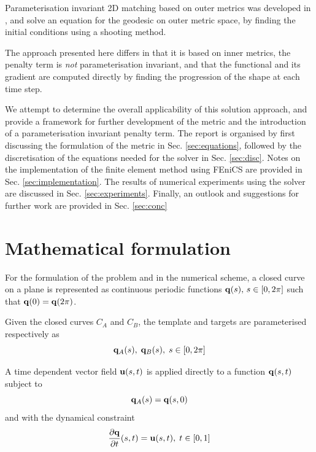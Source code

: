 \documentclass[a4paper, 12pt]{article}
\begin{document}
Parameterisation invariant 2D matching based on outer metrics was developed in
\cite{cotter2009geodesic, cotter2009curves, clark2011reparam}, and solve an
equation for the geodesic on outer metric space, by finding the initial
conditions using a shooting method.

The approach presented here differs in that it is based on inner metrics, the
penalty term is \emph{not} parameterisation invariant, and that the
functional and its gradient are computed directly by finding the
progression of the shape at each time step.


We attempt to determine the overall applicability of this solution approach, and
provide a framework for further development of the metric and the introduction
of a parameterisation invariant penalty term. The report is organised by first
discussing the formulation of the metric in Sec. \ref{sec:equations}, followed
by the discretisation of the equations needed for the solver in
Sec. \ref{sec:disc}. Notes on the implementation of the finite element method
using FEniCS are provided in Sec. \ref{sec:implementation}. The results of numerical
experiments using the solver are discussed in
Sec. \ref{sec:experiments}. Finally, an outlook and suggestions for further work
are provided in Sec. \ref{sec:conc}


\section{Mathematical formulation \label{sec:equations}}

For the formulation of the problem and in the numerical scheme, a closed curve
on a plane is represented as continuous periodic functions  $\mathbf{q}(s),\, s \in [0,2\pi]$ such that
$\mathbf{q}(0) = \mathbf{q}(2\pi)$.

Given the closed curves $C_{A}$ and $C_B$, the template and targets are
parameterised respectively as
\begin{equation}
  \label{eq:qAqB}
  \mathbf{q}_{A}(s),\; \mathbf{q}_{B}(s),\; s \in [0,2\pi]
\end{equation}

A time dependent vector field $\mathbf{u}(s,t)$ is applied directly to a function
$\mathbf{q}(s,t)$ subject to
\begin{equation}
  \mathbf{q}_A(s) =\mathbf{q}(s,0)   \label{eq:template}
\end{equation}
and with the dynamical constraint
\begin{equation}
  \frac{\partial \mathbf{q}}{\partial t}(s,t) = \mathbf{u}(s,t) ,\; t \in [0,1]  \label{eq:dqdt}
\end{equation}
\end{document}
